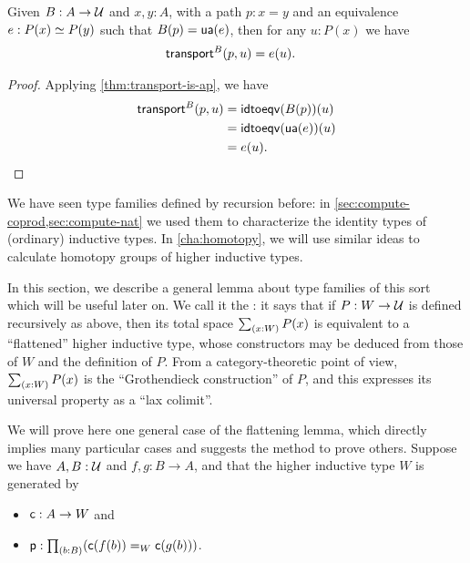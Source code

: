\begin{lem}\label{thm:transport-is-given}
  Given $B:A\to\mathcal{U}$ and $x,y:A$, with a path $p:x=y$ and an equivalence $e:P(x) \simeq P(y)$ such that ${B}\mathopen{}\left({p}\right)\mathclose{} = \mathsf{ua}(e)$, then for any $u:P(x)$ we have
  \begin{align*}
    \mathsf{transport}^{B}(p,u) &= e(u).
  \end{align*}
\end{lem}
\begin{proof}
  Applying \autoref{thm:transport-is-ap}, we have
  \begin{align*}
    \mathsf{transport}^{B}(p,u) &= \mathsf{idtoeqv}({B}\mathopen{}\left({p}\right)\mathclose{})(u)\\
    &= \mathsf{idtoeqv}(\mathsf{ua}(e))(u)\\
    &= e(u).\qedhere
  \end{align*}
\end{proof}

We have seen type families defined by recursion before: in \autoref{sec:compute-coprod,sec:compute-nat} we used them to characterize the identity types of (ordinary) inductive types.
In \autoref{cha:homotopy}, we will use similar ideas to calculate homotopy groups of higher inductive types.

In this section, we describe a general lemma about type families of this sort which will be useful later on.
We call it the : it says that if $P:W\to\mathcal{U}$ is defined recursively as above, then its total space $\sm{x:W} P(x)$ is equivalent to a ``flattened'' higher inductive type, whose constructors may be deduced from those of $W$ and the definition of $P$.
From a category-theoretic point of view, $\sm{x:W} P(x)$ is the ``Grothendieck construction'' of $P$, and this expresses its universal property as a ``lax colimit''.

We will prove here one general case of the flattening lemma, which directly implies many particular cases and suggests the method to prove others.
Suppose we have $A,B:\mathcal{U}$ and $f,g:B\to{}A$, and that the higher inductive type $W$ is generated by
\begin{itemize}
\item $\mathsf{c}:A\to{}W$ and
\item $\pp:\prd{b:B} (\cc(f(b))=_W\cc(g(b)))$.
\end{itemize}

